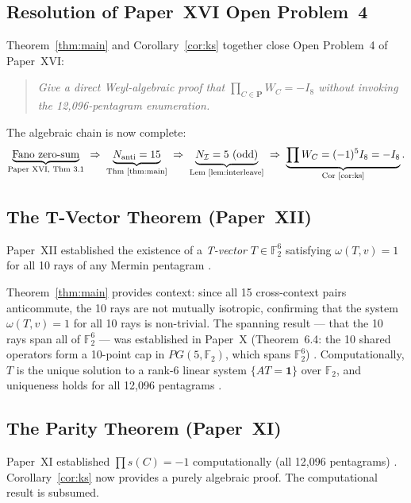 \documentclass[11pt,a4paper]{article}
\theoremstyle{remark}
\begin{document}
\subsection{Resolution of Paper~XVI Open Problem~4}

Theorem~\ref{thm:main} and Corollary~\ref{cor:ks} together close
Open Problem~4 of Paper~XVI:

\begin{quote}
\emph{Give a direct Weyl-algebraic proof that
$\prod_{C \in \mathbf{P}} W_C = -I_8$
without invoking the 12{,}096-pentagram enumeration.}
\end{quote}

The algebraic chain is now complete:
\[
  \underbrace{\text{Fano zero-sum}}_{\text{Paper~XVI, Thm~3.1}}
  \;\Rightarrow\;
  \underbrace{N_{\mathrm{anti}} = 15}_{\text{Thm~\ref{thm:main}}}
  \;\Rightarrow\;
  \underbrace{N_\mathcal{I} = 5 \text{ (odd)}}_{\text{Lem~\ref{lem:interleave}}}
  \;\Rightarrow\;
  \underbrace{\prod W_C = (-1)^5 I_8 = -I_8}_{\text{Cor~\ref{cor:ks}}}.
\]

\subsection{The T-Vector Theorem (Paper~XII)}

Paper~XII established the existence of a \emph{T-vector}
$T \in \mathbb{F}_2^6$ satisfying $\omega(T, v) = 1$ for all 10 rays
of any Mermin pentagram \cite{PaperXII}.

Theorem~\ref{thm:main} provides context: since all 15 cross-context
pairs anticommute, the 10 rays are not mutually isotropic, confirming
that the system $\omega(T,v)=1$ for all 10 rays is non-trivial.
The spanning result --- that the 10 rays span all of $\mathbb{F}_2^6$
--- was established in Paper~X (Theorem~6.4: the 10 shared operators
form a 10-point cap in $PG(5,\mathbb{F}_2)$, which spans $\mathbb{F}_2^6$)
\cite{PaperX}.
Computationally, $T$ is the unique solution to a rank-6 linear system
$\{AT = \mathbf{1}\}$ over $\mathbb{F}_2$, and uniqueness holds for all
12{,}096 pentagrams \cite{PaperXVIIsuppl}.

\subsection{The Parity Theorem (Paper~XI)}

Paper~XI established $\prod s(C) = -1$ computationally
(all 12{,}096 pentagrams) \cite{PaperXI}.
Corollary~\ref{cor:ks} now provides a purely algebraic proof.
The computational result is subsumed.
\end{document}
